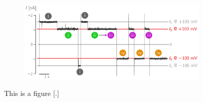 \begin{figure}[ht]
\begin{centering}
\begin{subfigure}[t]{\dimexpr.8\linewidth-1.3em\relax}
  \end{subfigure}%
  \vspace{0.5cm}
  \begin{subfigure}[t]{\dimexpr.8\linewidth-1.3em\relax}
  \centering
  \includegraphics[width=\linewidth,valign=t]{Figures/RConstruction3.png}
  \end{subfigure}
  \caption{This is a figure [.]}
  \label{fig:test}
  \end{centering}
\end{figure}
